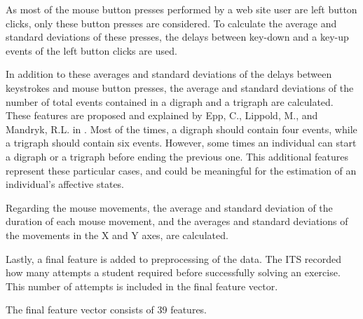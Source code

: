 \documentclass[runningheads,a4paper]{llncs}
\begin{document}
As most of the mouse button presses performed by a web site user are left button clicks, only these button presses are considered. To calculate the average and standard deviations of these presses, the delays between key-down and a key-up events of the left button clicks are used.

In addition to these averages and standard deviations of the delays between keystrokes and mouse button presses, the average and standard deviations of the number of total events contained in a digraph and a trigraph are calculated. These features are proposed and explained by Epp, C., Lippold, M., and Mandryk, R.L. in \cite{keystroke-dynamics1}. Most of the times, a digraph should contain four events, while a trigraph should contain six events. However, some times an individual can start a digraph or a trigraph before ending the previous one. This additional features represent these particular cases, and could be meaningful for the estimation of an individual's affective states.

Regarding the mouse movements, the average and standard deviation of the duration of each mouse movement, and the averages and standard deviations of the movements in the X and Y axes, are calculated.

Lastly, a final feature is added to preprocessing of the data. The ITS recorded how many attempts a student required before successfully solving an exercise. This number of attempts is included in the final feature vector.

The final feature vector consists of 39 features.
\end{document}
